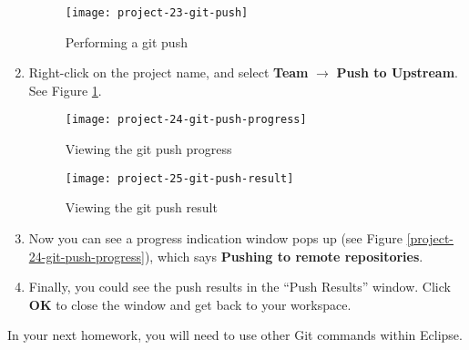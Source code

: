 \begin{enumerate}
\begin{figure}[t]
\centering
\texttt{[image: project-23-git-push]}
\caption{Performing a git push\label{project-23-git-push}}
\end{figure}

\item Right-click on the project name, and select \textbf{Team} $\rightarrow$
\textbf{Push to Upstream}. See Figure \ref{project-23-git-push}.

\begin{figure}[t]
\hspace{-2em}
\begin{minipage}{0.5\textwidth}
\centering
\texttt{[image: project-24-git-push-progress]}
\caption{Viewing the git push progress\label{project-24-git-push-progress}}
\end{minipage}
\hfill
\begin{minipage}{0.5\textwidth}
\centering
\texttt{[image: project-25-git-push-result]}
\caption{Viewing the git push result\label{project-25-git-push-result}}
\end{minipage}
\hspace{-1em}
\end{figure}

\item Now you can see a progress indication window pops up (see Figure
\ref{project-24-git-push-progress}), which says \textbf{Pushing to remote
repositories}.

\item Finally, you could see the push results in the ``Push Results'' window.
Click \textbf{OK} to close the window and get back to your workspace.

\end{enumerate}

In your next homework, you will need to use other Git commands within Eclipse.
